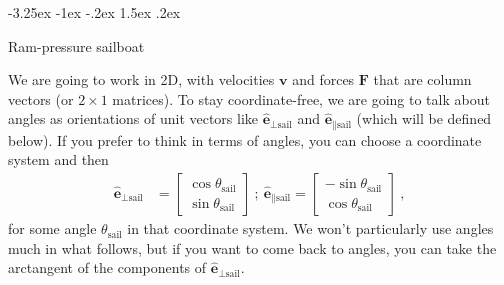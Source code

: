 \documentclass[letterpaper]{article}
\makeatletter
\renewcommand{\vec}[1]{\boldsymbol{#1}}
\newcommand{\uvec}{\vec{\hat{e}}}
\newcommand{\sail}{\text{sail}}
\renewcommand\section{\@startsection {section}{1}{\z@}%
  {-3.25ex \@plus -1ex \@minus -.2ex}%
  {1.5ex \@plus .2ex}%
  {\raggedright\normalfont\large\bfseries}}
\makeatother
\begin{document}
\section{Ram-pressure sailboat}\label{sec:model}

We are going to work in 2D, with velocities $\vec{v}$ and forces $\vec{F}$ that are column vectors (or $2\times 1$ matrices).
To stay coordinate-free, we are going to talk about angles as orientations of unit vectors like $\uvec_{\perp\sail}$ and $\uvec_{\parallel\sail}$ (which will be defined below).
If you prefer to think in terms of angles, you can choose a coordinate system and then
\begin{align}
    \uvec_{\perp\sail} &= \begin{bmatrix}\cos\theta_\sail \\ \sin\theta_\sail\end{bmatrix} ~ ; ~ \uvec_{\parallel\sail} = \begin{bmatrix}-\sin\theta_\sail \\ \cos\theta_\sail\end{bmatrix} ~,
\end{align}
for some angle $\theta_\sail$ in that coordinate system.
We won't particularly use angles much in what follows, but if you want to come back to angles, you can take the arctangent of the components of $\uvec_{\perp\sail}$.
\end{document}
